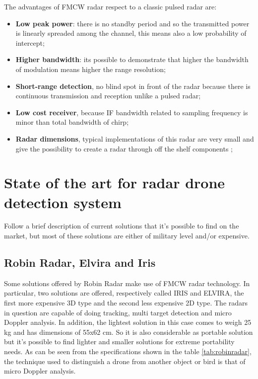The advantages of FMCW radar respect to a classic pulsed radar are:

\begin{itemize}

    \item \textbf{Low peak power}: there is no standby period and so the transmitted power is linearly spreaded among the channel, this means also a low probability of intercept; 
         
    \item \textbf{Higher bandwidth}: its possible to demonstrate that higher the bandwidth of modulation means higher the range resolution; 
    
    \item \textbf{Short-range detection}, no blind spot in front of the radar because there is continuous transmission and reception unlike a pulsed radar;

    \item \textbf{Low cost receiver}, because IF bandwidth related to sampling frequency is minor than total bandwidth of  chirp;
    
    \item \textbf{Radar dimensions}, typical implementations of this radar are very small and give the possibility to create a radar through off the shelf components ;
        
\end{itemize}

\section{State of the art for radar drone detection system}
Follow a brief description of current solutions that it's possible to find on the market, but most of these solutions are either of military level and/or expensive. 
\subsection{Robin Radar, Elvira and Iris}
Some solutions offered by Robin Radar make use of FMCW radar technology.  In particular, two solutions are offered, respectively called IRIS and ELVIRA, the first more expensive 3D type and the second less expensive 2D type. The radars in question are capable of doing tracking, multi target detection and micro Doppler analysis. In addition, the lightest solution in this case comes to weigh 25 kg and has dimensions of 55x62 cm. So it is also considerable as portable solution but it's possible to find lighter and smaller solutions for extreme portability needs. As can be seen from the specifications shown in the table \ref{tab:robinradar}, the technique used to distinguish a drone from another object or bird is that of micro Doppler analysis.

